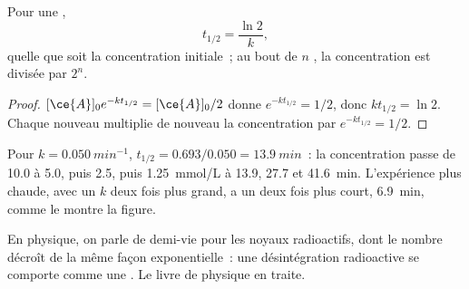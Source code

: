 \begin{proposition}\label{prop:g12:reaction-rates:half-life}
Pour une ,
\[
  t_{1/2} = \frac{\ln 2}{k},
\]
quelle que soit la concentration initiale~; au bout de $n$ , la concentration est divisée par $2^n$.
\end{proposition}

\begin{proof}
$[\ce{A}]_0 e^{-k t_{1/2}} = [\ce{A}]_0 / 2$ donne $e^{-k t_{1/2}} = 1/2$,
donc $k t_{1/2} = \ln 2$. Chaque nouveau 
multiplie de nouveau la concentration par $e^{-k t_{1/2}} = 1/2$.
\end{proof}


\begin{example}\label{ex:g12:reaction-rates:half-lives}
Pour $k = \qty{0.050}{min^{-1}}$, $t_{1/2} = 0.693 / 0.050 =
\qty{13.9}{min}$~: la concentration passe de 10.0 à 5.0, puis 2.5, puis
\qty{1.25}{mmol/L} à 13.9, 27.7 et \qty{41.6}{min}. L'expérience plus
chaude, avec un $k$ deux fois plus grand, a un 
deux fois plus court, \qty{6.9}{min}, comme le montre la figure.
\end{example}

\begin{remark}\label{rem:g12:reaction-rates:radioactive}
En physique, on parle de demi-vie pour les noyaux radioactifs, dont le
nombre décroît de la même façon exponentielle~: une désintégration
radioactive se comporte comme une . Le livre de
physique en traite.
\end{remark}

